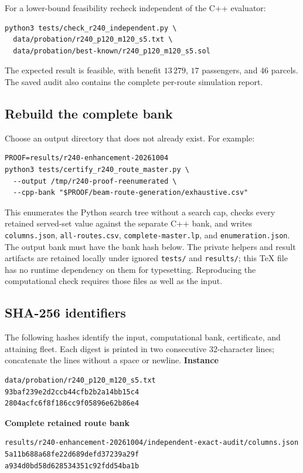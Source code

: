 \documentclass[11pt,a4paper]{article}
\begin{document}
For a lower-bound feasibility recheck independent of the C++ evaluator:
\begin{verbatim}
python3 tests/check_r240_independent.py \
  data/probation/r240_p120_m120_s5.txt \
  data/probation/best-known/r240_p120_m120_s5.sol
\end{verbatim}
The expected result is feasible, with benefit $13\,279$, $17$ passengers,
and $46$ parcels. The saved audit also contains the complete per-route
simulation report.

\subsection{Rebuild the complete bank}

Choose an output directory that does not already exist. For example:
\begin{verbatim}
PROOF=results/r240-enhancement-20261004
python3 tests/certify_r240_route_master.py \
  --output /tmp/r240-proof-reenumerated \
  --cpp-bank "$PROOF/beam-route-generation/exhaustive.csv"
\end{verbatim}
This enumerates the Python search tree without a search cap, checks every
retained served-set value against the separate C++ bank, and writes
\texttt{columns.json}, \texttt{all-routes.csv}, \texttt{complete-master.lp},
and \texttt{enumeration.json}. The output bank must have the bank hash below.
The private helpers and result artifacts are retained locally under ignored
\texttt{tests/} and \texttt{results/}; this TeX file has no runtime dependency
on them for typesetting. Reproducing the computational check requires those
files as well as the input.

\subsection{SHA-256 identifiers}

The following hashes identify the input, computational bank, certificate,
and attaining fleet. Each digest is printed in two consecutive 32-character
lines; concatenate the lines without a space or newline.
\noindent\textbf{Instance}\par
\begin{verbatim}
data/probation/r240_p120_m120_s5.txt
93baf239e2d2ccb44cfb2b2a14bb15c4
2804acfc6f8f186cc9f05896e62b86e4
\end{verbatim}

\noindent\textbf{Complete retained route bank}\par
\begin{verbatim}
results/r240-enhancement-20261004/independent-exact-audit/columns.json
5a11b688a68fe22d689defd37239a29f
a934d0bd58d628534351c92fdd54ba1b
\end{verbatim}
\end{document}
